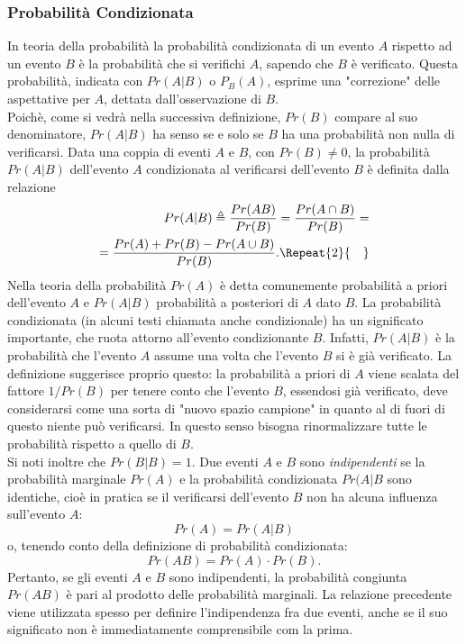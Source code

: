 \documentclass[12pt,oneside,openany]{memoir}
\numberwithin{equation}{subsection}
\newcommand{\quads}[1]{\Repeat{#1}{\quad}}
\begin{document}
\subsubsection{Probabilit\`a Condizionata}
In teoria della probabilit\`a la probabilit\`a condizionata di un evento $A$
rispetto ad un evento $B$ \`e la probabilit\`a che si verifichi $A$, sapendo che
$B$ \`e verificato. Questa probabilit\`a, indicata con $Pr(A | B)$ o $P_{B}(A)$,
esprime una "correzione" delle aspettative per $A$, dettata dall'osservazione di
$B$.\\
Poich\`e, come si vedr\`a nella successiva definizione, $Pr(B)$ compare al
suo denominatore, $Pr(A | B)$ ha senso se e solo se $B$ ha una probabilit\`a non
nulla di verificarsi.
\bigbreak
Data una coppia di eventi $A$ e $B$, con $Pr(B) \neq 0$, la probabilit\`a
$Pr(A|B)$ dell'evento $A$ condizionata al verificarsi dell'evento $B$ \`e
definita dalla relazione
\begin{equation}
    \begin{split}
        Pr(A | B) \triangleq \frac{Pr(AB)}{Pr(B)} = \frac{Pr(A \cap B)}{Pr(B)} =
        \\
        = \frac{Pr(A) + Pr(B) - Pr(A \cup B)}{Pr(B)}.
        \quads{2}
    \end{split}
\end{equation}
\bigbreak
Nella teoria della probabilit\`a $Pr(A)$ \`e detta comunemente probabilit\`a a
priori dell'evento $A$ e $Pr(A | B)$ probabilit\`a a posteriori di $A$ dato $B$.
La probabilit\`a condizionata (in alcuni testi chiamata anche condizionale) ha
un significato importante, che ruota attorno all'evento condizionante $B$.
Infatti, $Pr(A | B)$ \`e la probabilit\`a che l'evento $A$ assume una volta che
l'evento $B$ si \`e gi\`a verificato. La definizione suggerisce proprio questo:
la probabilit\`a a priori di $A$ viene scalata del fattore $1/Pr(B)$ per tenere
conto che l'evento $B$, essendosi gi\`a verificato, deve considerarsi come una
sorta di "nuovo spazio campione" in quanto al di fuori di questo niente pu\`o
verificarsi. In questo senso bisogna rinormalizzare tutte le probabilit\`a
rispetto a quello di $B$.\\
Si noti inoltre che $Pr(B | B) = 1$.
\bigbreak
Due eventi $A$ e $B$ sono \textit{indipendenti} se la probabilit\`a marginale
$Pr(A)$ e la probabilit\`a condizionata $Pr(A | B$ sono identiche, cio\`e in
pratica se il verificarsi dell'evento $B$ non ha alcuna influenza sull'evento
$A$:
\[
    Pr(A) = Pr(A|B)
\]
o, tenendo conto della definizione di probabilit\`a condizionata:
\[
    Pr(AB) = Pr(A) \cdot Pr(B).
\]
Pertanto, se gli eventi $A$ e $B$ sono indipendenti, la probabilit\`a congiunta
$Pr(AB)$ \`e pari al prodotto delle probabilit\`a marginali. La relazione
precedente viene utilizzata spesso per definire l'indipendenza fra due eventi,
anche se il suo significato non \`e immediatamente comprensibile com la prima.
\end{document}
